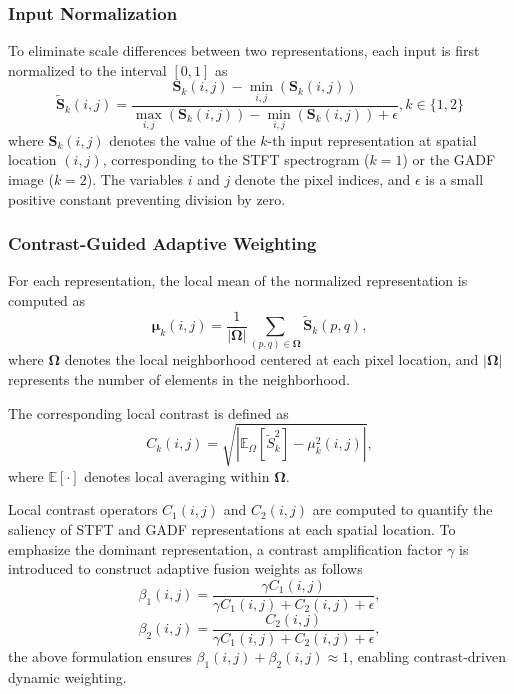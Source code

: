 \documentclass[journal]{IEEEtran}
\begin{document}
\subsubsection{Input Normalization}
To eliminate scale differences between two representations, each input is first normalized to the interval $[0,1]$ as
\begin{equation}
	\boldsymbol{\tilde{S}}_k(i,j) = \frac{\boldsymbol{S}_k(i,j) - \min\limits_{i,j} (\boldsymbol{S}_k(i,j))}{\max\limits_{i,j} (\boldsymbol{S}_k(i,j)) - \min\limits_{i,j} (\boldsymbol{S}_k(i,j)) + \epsilon}, k\in\{1,2\}
	\label{eq:normalization}
\end{equation}
where $\boldsymbol{S}_k(i,j)$ denotes the value of the $k$-th input representation at spatial location $(i,j)$, corresponding to the STFT spectrogram ($k=1$) or the GADF image ($k=2$). The variables $i$ and $j$ denote the pixel indices, and $\epsilon$ is a small positive constant preventing division by zero.

\subsubsection{Contrast-Guided Adaptive Weighting}
For each representation, the local mean of the normalized representation is computed as
\begin{equation}
	\boldsymbol{\mu}_k(i,j) = \frac{1}{|\boldsymbol{\Omega}|}
	\sum_{(p,q)\in \boldsymbol{\Omega}} \boldsymbol{\tilde{S}}_k(p,q),
	\label{eq:local_mean}
\end{equation}
where $\boldsymbol{\Omega}$ denotes the local neighborhood centered at each pixel location, and $|\boldsymbol{\Omega}|$ represents the number of elements in the neighborhood.

The corresponding local contrast is defined as
\begin{equation}
	C_k(i,j) = \sqrt{ \left| \mathbb{E}_\Omega \left[ \tilde{S}_k^2 \right] - \mu_k^2(i,j) \right| },
	\label{eq:eq:local_contrast}
\end{equation}
where $\mathbb{E}[\cdot]$ denotes local averaging within $\boldsymbol{\Omega}$.

Local contrast operators $C_1(i,j)$ and $C_2(i,j)$ are computed to quantify the saliency of STFT and GADF representations at each spatial location. To emphasize the dominant representation, a contrast amplification factor $\gamma$ is introduced to construct adaptive fusion weights as follows
\begin{equation}
	\beta_1(i,j) = 
	\frac{\gamma C_1(i,j)}
	{\gamma C_1(i,j) + C_2(i,j) + \epsilon},
	\label{eq:beta1}
\end{equation}
\begin{equation}
	\beta_2(i,j) = 
	\frac{C_2(i,j)}
	{\gamma C_1(i,j) + C_2(i,j) + \epsilon},
	\label{eq:beta2}
\end{equation}
the above formulation ensures $\beta_1(i,j) + \beta_2(i,j) \approx 1$, enabling contrast-driven dynamic weighting.
\end{document}
